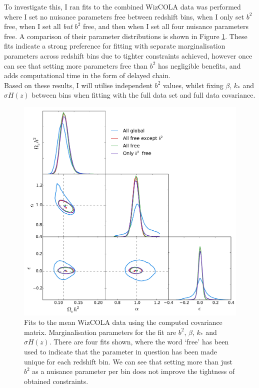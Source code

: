 \documentclass[titlesmallcaps, examinerscopy, copyrightpage]{uqthesis}
\begin{document}
To investigate this, I ran fits to the combined WizCOLA data was performed where I set no nuisance parameters free between redshift bins, when I only set $b^2$ free, when I set all \textit{but} $b^2$ free, and then when I set all four nuisance parameters free. A comparison of their parameter distributions is shown in Figure \ref{fig:wizcolaAllNormalCovCombined}. These fits indicate a strong preference for fitting with separate marginalisation parameters across redshift bins due to tighter constraints achieved, however once can see that setting more parameters free than $b^2$ has negligible benefits, and adds computational time in the form of delayed chain.\\

Based on these results, I will utilise independent $b^2$ values, whilst fixing $\beta$, $k_*$ and $\sigma H(z)$ between bins when fitting with the full data set and full data covariance.\\


\begin{figure}[h!]
  \begin{center}
    \includegraphics[width=\textwidth]{images/wizcolaAllNormalCovCombined.pdf}
  \end{center}
  \caption{Fits to the mean WizCOLA data using the computed covariance matrix. Marginalisation parameters for the fit are $b^2$, $\beta$, $k_*$ and $\sigma H(z)$. There are four fits shown, where the word `free' has been used to indicate that the parameter in question has been made unique for each redshift bin. We can see that setting more than just $b^2$ as a nuisance parameter per bin does not improve the tightness of obtained constraints.}
  \label{fig:wizcolaAllNormalCovCombined}
\end{figure}
\end{document}
